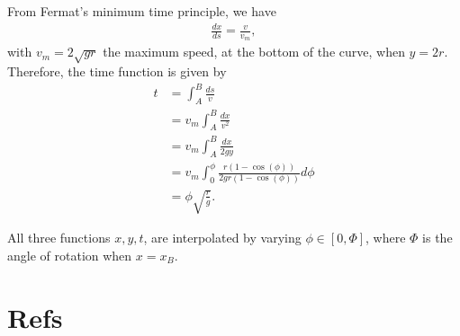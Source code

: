 \documentclass{article}
\begin{document}
From Fermat’s minimum time principle, we have
\begin{align}
  \frac{dx}{ds} = \frac{v}{v_m},
\end{align}
with $v_m = 2\sqrt{gr}$ the maximum speed, at the bottom of the curve, when $y=2r$. Therefore, the time function is given by
\begin{align}
  t &= \int_{A}^{B} \frac{ds}{v}\\
  & = v_m \int_{A}^{B} \frac{dx}{v^2}\\
  & = v_m \int_{A}^{B} \frac{dx}{2 gy}\\
  & = v_m \int_{0}^{\phi} \frac{r(1 - \cos(\phi))}{2 gr(1-\cos(\phi))}d\phi\\
  & = \phi \sqrt{\frac rg}.
\end{align}

All three functions $x, y, t$, are interpolated by varying $\phi\in [0,\Phi]$, where $\Phi$ is the angle of rotation when $x=x_B$.


\section*{Refs}

\end{document}
